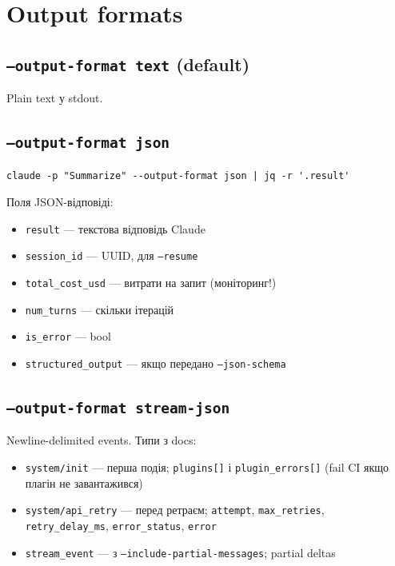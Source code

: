\documentclass[11pt,a4paper]{article}
\begin{document}
\section{Output formats}

\subsection{\texttt{--output-format text} (default)}

Plain text у stdout.

\subsection{\texttt{--output-format json}}

\begin{lstlisting}
claude -p "Summarize" --output-format json | jq -r '.result'
\end{lstlisting}

Поля JSON-відповіді:
\begin{itemize}[leftmargin=2em]
\item \texttt{result} --- текстова відповідь Claude
\item \texttt{session\_id} --- UUID, для \texttt{--resume}
\item \texttt{total\_cost\_usd} --- витрати на запит (моніторинг!)
\item \texttt{num\_turns} --- скільки ітерацій
\item \texttt{is\_error} --- bool
\item \texttt{structured\_output} --- якщо передано \texttt{--json-schema}
\end{itemize}

\subsection{\texttt{--output-format stream-json}}

Newline-delimited events. Типи з docs:
\begin{itemize}[leftmargin=2em]
\item \texttt{system/init} --- перша подія; \texttt{plugins[]} і \texttt{plugin\_errors[]} (fail CI якщо плагін не завантажився)
\item \texttt{system/api\_retry} --- перед ретраєм; \texttt{attempt}, \texttt{max\_retries}, \texttt{retry\_delay\_ms}, \texttt{error\_status}, \texttt{error}
\item \texttt{stream\_event} --- з \texttt{--include-partial-messages}; partial deltas
\end{itemize}
\end{document}

